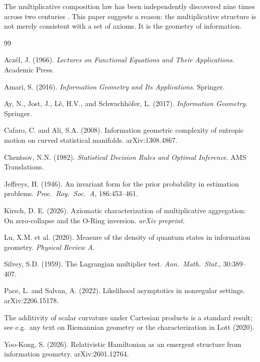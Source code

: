 \documentclass[12pt, a4paper]{article}
\theoremstyle{definition}
\theoremstyle{remark}
\begin{document}
The multiplicative composition law has been independently discovered nine times across two centuries \cite{kirsch2026mc}. This paper suggests a reason: the multiplicative structure is not merely consistent with a set of axioms. It is the geometry of information.

\begin{thebibliography}{99}

 Acz\'el, J. (1966). \textit{Lectures on Functional Equations and Their Applications}. Academic Press.

 Amari, S. (2016). \textit{Information Geometry and Its Applications}. Springer.

 Ay, N., Jost, J., L\^e, H.V., and Schwachh\"ofer, L. (2017). \textit{Information Geometry}. Springer.

 Cafaro, C. and Ali, S.A. (2008). Information geometric complexity of entropic motion on curved statistical manifolds. arXiv:1308.4867.

 Chentsov, N.N. (1982). \textit{Statistical Decision Rules and Optimal Inference}. AMS Translations.

 Jeffreys, H. (1946). An invariant form for the prior probability in estimation problems. \textit{Proc.\ Roy.\ Soc.\ A}, 186:453--461.

 Kirsch, D. E. (2026). Axiomatic characterization of multiplicative aggregation: On zero-collapse and the O-Ring inversion. \textit{arXiv preprint}.

 Lu, X.M. et al. (2020). Measure of the density of quantum states in information geometry. \textit{Physical Review A}.

 Silvey, S.D. (1959). The Lagrangian multiplier test. \textit{Ann.\ Math.\ Stat.}, 30:389--407.

 Pace, L. and Salvan, A. (2022). Likelihood asymptotics in nonregular settings. arXiv:2206.15178.

 The additivity of scalar curvature under Cartesian products is a standard result; see e.g.\ any text on Riemannian geometry or the characterization in Lott (2020).

 Yoo-Kong, S. (2026). Relativistic Hamiltonian as an emergent structure from information geometry. arXiv:2601.12764.

\end{thebibliography}
\end{document}
